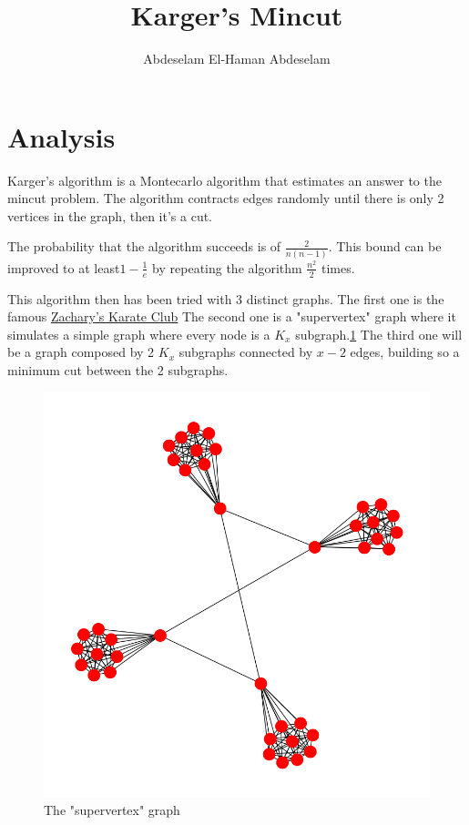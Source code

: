 \documentclass[a4paper,10pt]{article}
\title{Karger's Mincut}
\author{Abdeselam El-Haman Abdeselam}
\begin{document}
\sloppy
\maketitle


\section{Analysis}

Karger's algorithm is a Montecarlo algorithm that estimates an answer to the mincut problem.
The algorithm contracts edges randomly until there is only 2 vertices in the graph, then it's a cut.

The probability that the algorithm succeeds is of $\frac{2}{n(n-1)}$. This bound can be improved to at least$1 - \frac{1}{e}$ by repeating the
algorithm $\frac{n^2}{2}$ times.

This algorithm then has been tried with 3 distinct graphs.
The first one is the famous \href{https://en.wikipedia.org/wiki/Zachary's_karate_club}{Zachary's Karate Club}
The second one is a "supervertex" graph where it simulates a simple graph where every node is a $K_x$ subgraph.\ref{supervertex}
The third one will be a graph composed by 2 $K_x$ subgraphs connected by $x-2$ edges, building so a minimum
cut between the 2 subgraphs.

\begin{figure}[h]
\includegraphics[width=\linewidth]{graph2}
\caption{The "supervertex" graph}
\label{supervertex}
\end{figure}
\end{document}
